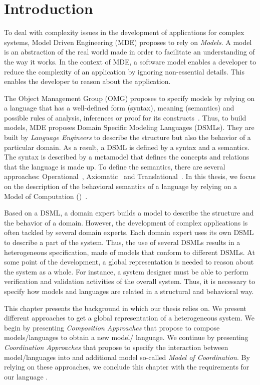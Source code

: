 \section{Introduction}
To deal with complexity issues in the development of applications for complex systems, Model Driven Engineering (MDE) proposes to rely on \emph{Models}. A model is an abstraction of the real world made in order to facilitate an understanding of the way it works. In the context of MDE, a software model enables a developer to reduce the complexity of an application by ignoring non-essential details. This enables the developer to reason about the application. 

The Object Management Group (OMG) proposes to specify models by relying on a language that has a well-defined form (syntax), meaning (semantics) and possible rules of analysis, inferences or proof for its constructs~\cite{mdaguide}. Thus, to build models, MDE proposes Domain Specific Modeling Languages (DSMLs). They are built by \emph{Language Engineers} to describe the structure but also the behavior of a particular domain. As a result, a DSML is defined by a syntax and a semantics. The syntax is described by a metamodel that defines the concepts and relations that the language is made up. To define the semantics, there are several approaches: Operational~\cite{operationbib}, Axiomatic~\cite{axiomaticbib} and Translational~\cite{translationalbib}. In this thesis, we focus on the description of the behavioral semantics of a language by relying on a Model of Computation (\mocc)~\cite{moccsemanticbib}. 

Based on a DSML, a domain expert builds a model to describe the structure and the behavior of a domain. However, the development of complex applications is often tackled by several domain experts. Each domain expert uses its own DSML to describe a part of the system. Thus, the use of several DSMLs results in a heterogeneous specification, \ie made of models that conform to different DSMLs. At some point of the development, a global representation is needed to reason about the system as a whole. For instance, a system designer must be able to perform verification and validation activities of the overall system. Thus, it is necessary to specify how models and languages are related in a structural and behavioral way. 

This chapter presents the background in which our thesis relies on. We present different approaches to get a global representation of a heterogeneous system. We begin by presenting \emph{Composition Approaches} that propose to compose models/languages to obtain a new model/ language. We continue by presenting \emph{Coordination Approaches} that propose to specify the interaction between model/languages into and additional model so-called \emph{Model of Coordination}. By relying on these approaches, we conclude this chapter with the requirements for our language \bcool.  

